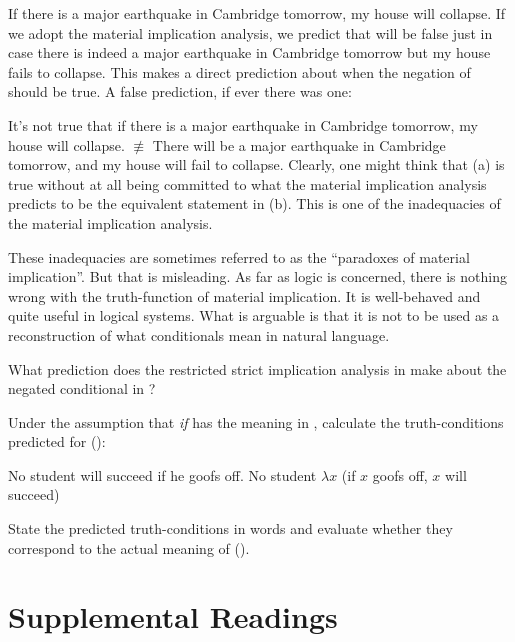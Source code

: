 \ex[exno=\ref{ex:earthquake}] If there is a major earthquake in Cambridge
tomorrow, my house will collapse. \xe
%
If we adopt the material implication analysis, we predict that
 will be false just in case there is indeed a major
earthquake in Cambridge tomorrow but my house fails to collapse. This makes a
direct prediction about when the negation of  should be
true. A false prediction, if ever there was one:

\pex \a\label{neg-earthquake} It's not true that if there is a major earthquake
in Cambridge tomorrow, my house will collapse. \a $\not\equiv$ There will be a
major earthquake in Cambridge tomorrow, and my house will fail to collapse. \xe
%
Clearly, one might think that (\lastx a) is true without at all being committed
to what the material implication analysis predicts to be the equivalent
statement in (\lastx b). This is one of the inadequacies of the material
implication analysis.

These inadequacies are sometimes referred to as the ``paradoxes of material
implication''. But that is misleading. As far as logic is concerned, there is
nothing wrong with the truth-function of material implication. It is
well-behaved and quite useful in logical systems. What is arguable is that it is
not to be used as a reconstruction of what conditionals mean in natural
language.

\begin{exercise}
	What prediction does the restricted strict implication analysis in
   make about the negated conditional in
  ? \eex
\end{exercise}

\begin{exercise}
  Under the assumption that \emph{if} has the meaning in ,
  calculate the truth-conditions predicted for (\nextx):

  \pex
  \a No student will succeed if he goofs off.
  \a No student $\lambda x$ (if $x$ goofs off, $x$ will succeed)
  \xe

State the predicted truth-conditions in words and evaluate whether they correspond to the actual meaning of (\lastx).
\eex
\end{exercise}

\section{Supplemental Readings}
\label{sec:supplemental}

